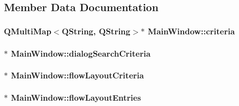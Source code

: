 \subsection{Member Data Documentation}
\hypertarget{class_main_window_a08a32bfae3ca7c8b1dc028a834ec3497}{
\subsubsection[{criteria}]{\setlength{\rightskip}{0pt plus 5cm}Q\+Multi\+Map$<$Q\+String, Q\+String$>$$\ast$ Main\+Window\+::criteria\hspace{0.3cm}{\ttfamily [private]}}}\label{class_main_window_a08a32bfae3ca7c8b1dc028a834ec3497}
\hypertarget{class_main_window_ac2f0214d0545709112d53986b9bbe9de}{
\subsubsection[{dialog\+Search\+Criteria}]{$\ast$ Main\+Window\+::dialog\+Search\+Criteria\hspace{0.3cm}{\ttfamily [private]}}}\label{class_main_window_ac2f0214d0545709112d53986b9bbe9de}
\hypertarget{class_main_window_aa63757c984cb46dbe48e53efba08fb23}{
\subsubsection[{flow\+Layout\+Criteria}]{$\ast$ Main\+Window\+::flow\+Layout\+Criteria\hspace{0.3cm}{\ttfamily [private]}}}\label{class_main_window_aa63757c984cb46dbe48e53efba08fb23}
\hypertarget{class_main_window_a51e44ed7a8024e94c17e87f817e7fbb3}{
\subsubsection[{flow\+Layout\+Entries}]{$\ast$ Main\+Window\+::flow\+Layout\+Entries\hspace{0.3cm}{\ttfamily [private]}}}\label{class_main_window_a51e44ed7a8024e94c17e87f817e7fbb3}
